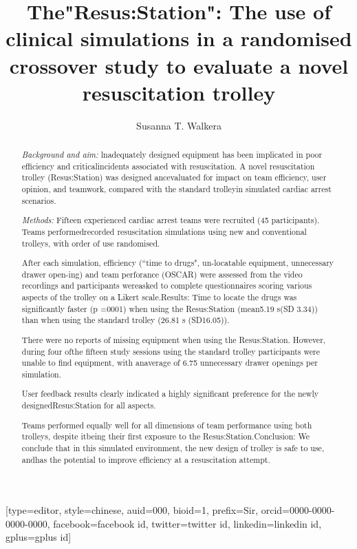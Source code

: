 \documentclass[a4paper,fleqn]{cas-dc}
\begin{document}
\title [mode = title]{The"Resus:Station": The use of clinical simulations in
a randomised crossover study to evaluate a novel resuscitation trolley}  


\author[1]{Susanna T. Walkera}[type=editor,
       style=chinese,
       auid=000,
       bioid=1,
       prefix=Sir,
       orcid=0000-0000-0000-0000,
       facebook=facebook id,
       twitter=twitter id,
       linkedin=linkedin id,
       gplus=gplus id]
       




\begin{abstract}
\emph{Background and aim:} lnadequately designed equipment has been implicated in poor efficiency and criticalincidents associated with resuscitation. A novel resuscitation trolley (Resus:Station) was designed ancevaluated for impact on team efficiency, user opinion, and teamwork, compared with the standard trolleyin simulated cardiac arrest scenarios.

\emph{Methods:} Fifteen experienced cardiac arrest teams were recruited (45 participants). Teams performedrecorded resuscitation simulations using new and conventional trolleys, with order of use randomised.

After each simulation, efficiency (“time to drugs", un-locatable equipment, unnecessary drawer open-ing) and team perforance (OSCAR) were assessed from the video recordings and participants wereasked to complete questionnaires scoring various aspects of the trolley on a Likert scale.Results: Time to locate the drugs was significantly faster (p =0001) when using the Resus:Station (mean5.19 s(SD 3.34)) than when using the standard trolley (26.81 s (SD16.05)).

There were no reports of missing equipment when using the Resus:Station. However, during four ofthe fifteen study sessions using the standard trolley participants were unable to find equipment, with anaverage of 6.75 unnecessary drawer openings per simulation.

User feedback results clearly indicated a highly significant preference for the newly designedResus:Station for all aspects.

Teams performed equally well for all dimensions of team performance using both trolleys, despite itbeing their first exposure to the Resus:Station.Conclusion: We conclude that in this simulated environment, the new design of trolley is safe to use, andhas the potential to improve efficiency at a resuscitation attempt.


\end{abstract}
\end{document}
